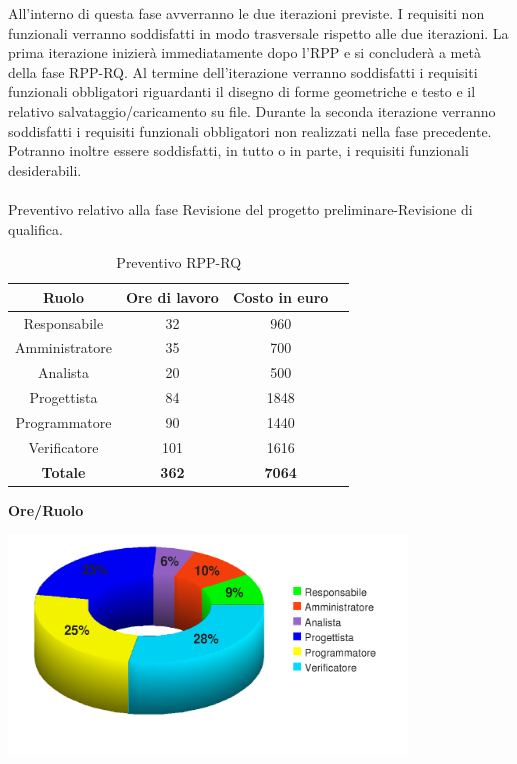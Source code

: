 All'interno di questa fase avverranno le due iterazioni previste. I requisiti non funzionali verranno soddisfatti in modo trasversale rispetto alle due iterazioni. La prima iterazione inizier\`a immediatamente dopo l'RPP e si concluder\`a a met\`a della fase RPP-RQ. Al termine dell'iterazione verranno soddisfatti i requisiti funzionali obbligatori riguardanti il disegno di forme geometriche e testo e il relativo salvataggio/caricamento su file. Durante la seconda iterazione verranno soddisfatti i requisiti funzionali obbligatori non realizzati nella fase precedente. Potranno inoltre essere soddisfatti, in tutto o in parte, i requisiti funzionali desiderabili.
\\
\\
Preventivo relativo alla fase Revisione del progetto preliminare-Revisione di qualifica.
\begin{table}[h]
	\begin{center}
		  \begin{tabular}{|c|c|c|c|}
		 \hline 
		 \textbf{Ruolo} & \textbf{Ore di lavoro} & \textbf{Costo in euro}\\
		 \hline
		Responsabile & 32 & 960 \\
		Amministratore & 35 & 700\\
		Analista & 20 & 500\\
		Progettista & 84 & 1848\\
		Programmatore & 90 & 1440 \\
		Verificatore & 101 & 1616\\
        \hline
        \textbf{Totale} & \textbf{362} & \textbf{7064}\\
		\hline
		\end{tabular}
	\caption{Preventivo RPP-RQ} 
	\label{tab:tabella_RPP-RQ}
	\end{center}	
\end{table}

\newpage
\begin{center}\textbf{Ore/Ruolo}
\end{center}
\includegraphics[width=300pt]{RPP-RQ_Ore}

